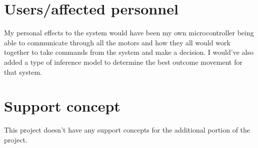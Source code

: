 \section{Users/affected personnel}
\label{loc:Users/affected personnel}
% 

My personal effects to the system would have been my own microcontroller being able to communicate through all the motors and how they all would work together to take commands from the system and make a decision. I would've also added a type of inference model to determine the best outcome movement for that system.

\section{Support concept}
\label{loc:Support concept}
% 

This project doesn't have any support concepts for the additional portion of the project.

